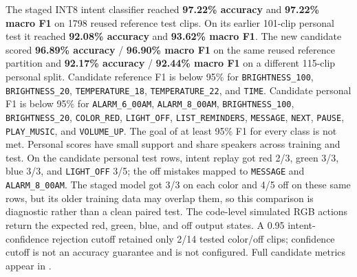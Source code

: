 \documentclass[11pt,a4paper]{article}
\begin{document}
The staged INT8 intent classifier reached \textbf{97.22\% accuracy} and \textbf{97.22\% macro F1} on 1798 reused reference test clips. On its earlier 101-clip personal test it reached \textbf{92.08\% accuracy} and \textbf{93.62\% macro F1}. The new candidate scored \textbf{96.89\% accuracy} / \textbf{96.90\% macro F1} on the same reused reference partition and \textbf{92.17\% accuracy} / \textbf{92.44\% macro F1} on a different 115-clip personal split. Candidate reference F1 is below 95\% for \texttt{BRIGHTNESS\_100}, \texttt{BRIGHTNESS\_20}, \texttt{TEMPERATURE\_18}, \texttt{TEMPERATURE\_22}, and \texttt{TIME}. Candidate personal F1 is below 95\% for \texttt{ALARM\_6\_00AM}, \texttt{ALARM\_8\_00AM}, \texttt{BRIGHTNESS\_100}, \texttt{BRIGHTNESS\_20}, \texttt{COLOR\_RED}, \texttt{LIGHT\_OFF}, \texttt{LIST\_REMINDERS}, \texttt{MESSAGE}, \texttt{NEXT}, \texttt{PAUSE}, \texttt{PLAY\_MUSIC}, and \texttt{VOLUME\_UP}. The goal of at least 95\% F1 for every class is not met. Personal scores have small support and share speakers across training and test. On the candidate personal test rows, intent replay got red 2/3, green 3/3, blue 3/3, and \texttt{LIGHT\_OFF} 3/5; the off mistakes mapped to \texttt{MESSAGE} and \texttt{ALARM\_8\_00AM}. The staged model got 3/3 on each color and 4/5 off on these same rows, but its older training data may overlap them, so this comparison is diagnostic rather than a clean paired test. The code-level simulated RGB actions return the expected red, green, blue, and off output states. A 0.95 intent-confidence rejection cutoff retained only 2/14 tested color/off clips; confidence cutoff is not an accuracy guarantee and is not configured. Full candidate metrics appear in .
\end{document}
